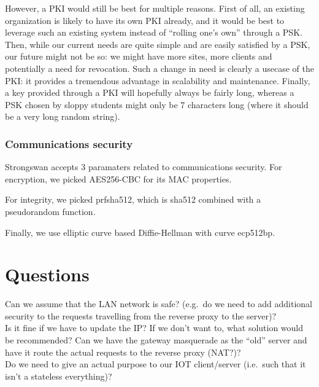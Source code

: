 \documentclass[paper=a4, fontsize=11pt]{scrartcl}
\begin{document}
However, a PKI would still be best for multiple reasons.
First of all, an existing organization is likely to have its own PKI already,
and it would be best to leverage such an existing system instead of ``rolling
one's own'' through a PSK\@.
Then, while our current needs are quite simple and are easily satisfied by a
PSK, our future might not be so: we might have more sites, more clients and
potentially a need for revocation.
Such a change in need is clearly a usecase of the PKI\@: it provides a tremendous
advantage in scalability and maintenance.
Finally, a key provided through a PKI will hopefully always be fairly long,
whereas a PSK chosen by sloppy students might only be 7 characters long (where
it should be a very long random string).

\subsubsection{Communications security}

Strongswan accepts 3 paramaters related to communications security.
For encryption, we picked AES256-CBC for its MAC properties\@.

For integrity, we picked prfsha512, which is sha512 combined with a pseudorandom
function.

Finally, we use elliptic curve based Diffie-Hellman with curve ecp512bp.

\section{Questions}

Can we assume that the LAN network is safe? (e.g.\ do we need to add additional
security to the requests travelling from the reverse proxy to the server)?\\

Is it fine if we have to update the IP\@?
If we don't want to, what solution would be recommended? Can we have the
gateway masquerade as the ``old'' server and have it route the actual requests to
the reverse proxy (NAT?)?\\

Do we need to give an actual purpose to our IOT client/server (i.e.\ such that
it isn't a stateless everything)?
\end{document}
